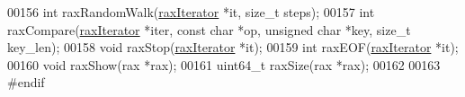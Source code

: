 \begin{DoxyCode}
00156 \textcolor{keywordtype}{int} raxRandomWalk(\hyperlink{structraxIterator}{raxIterator} *it, size\_t steps);
00157 \textcolor{keywordtype}{int} raxCompare(\hyperlink{structraxIterator}{raxIterator} *iter, \textcolor{keyword}{const} \textcolor{keywordtype}{char} *op, \textcolor{keywordtype}{unsigned} \textcolor{keywordtype}{char} *key, size\_t key\_len);
00158 \textcolor{keywordtype}{void} raxStop(\hyperlink{structraxIterator}{raxIterator} *it);
00159 \textcolor{keywordtype}{int} raxEOF(\hyperlink{structraxIterator}{raxIterator} *it);
00160 \textcolor{keywordtype}{void} raxShow(rax *rax);
00161 uint64\_t raxSize(rax *rax);
00162 
00163 \textcolor{preprocessor}{#}\textcolor{preprocessor}{endif}
\end{DoxyCode}
